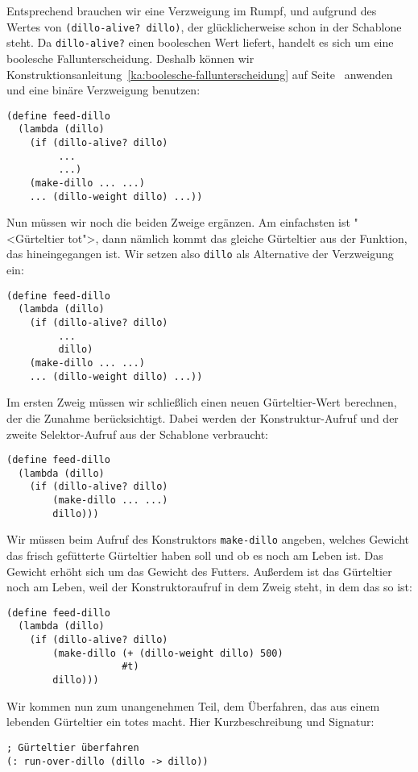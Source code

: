 Entsprechend brauchen wir eine Verzweigung im Rumpf, und aufgrund
des Wertes von \lstinline{(dillo-alive? dillo)}, der glücklicherweise schon in der
Schablone steht.  Da \lstinline{dillo-alive?} einen booleschen Wert
liefert, handelt es sich um eine boolesche Fallunterscheidung.
Deshalb 
können wir Konstruktionsanleitung~\ref{ka:boolesche-fallunterscheidung}
auf Seite~\pageref{ka:boolesche-fallunterscheidung} anwenden und eine
binäre Verzweigung benutzen:
%
\begin{lstlisting}
(define feed-dillo
  (lambda (dillo)
    (if (dillo-alive? dillo)
         ...
         ...)
    (make-dillo ... ...)
    ... (dillo-weight dillo) ...))
\end{lstlisting}
%
Nun müssen wir noch die beiden Zweige ergänzen.  Am
einfachsten ist "<Gürteltier tot">, dann nämlich kommt
das gleiche Gürteltier aus der Funktion, das hineingegangen ist.  Wir
setzen also \lstinline{dillo} als Alternative der Verzweigung ein:
%
\begin{lstlisting}
(define feed-dillo
  (lambda (dillo)
    (if (dillo-alive? dillo)
         ...
         dillo)
    (make-dillo ... ...)
    ... (dillo-weight dillo) ...))
\end{lstlisting}
%
Im ersten Zweig müssen wir schließlich einen neuen Gürteltier-Wert
berechnen, der die Zunahme berücksichtigt.  Dabei werden der
Konstruktur-Aufruf und der zweite Selektor-Aufruf aus der Schablone
verbraucht:
\begin{lstlisting}
(define feed-dillo
  (lambda (dillo)
    (if (dillo-alive? dillo)
        (make-dillo ... ...)
        dillo)))
\end{lstlisting}
%
Wir müssen beim Aufruf des Konstruktors \lstinline{make-dillo} angeben,
welches Gewicht das frisch gefütterte Gürteltier haben soll und ob es
noch am Leben ist.  Das Gewicht erhöht sich um das Gewicht des
Futters.  Außerdem ist das Gürteltier noch am Leben, weil der
Konstruktoraufruf in dem Zweig steht, in dem das so ist:
%
\begin{lstlisting}
(define feed-dillo
  (lambda (dillo)
    (if (dillo-alive? dillo)
        (make-dillo (+ (dillo-weight dillo) 500)
                    #t)
        dillo)))
\end{lstlisting}
%
Wir kommen nun zum unangenehmen Teil, dem Überfahren, das aus einem
lebenden Gürteltier ein totes macht.  Hier Kurzbeschreibung und
Signatur:\label{page:run-over-dillo}
%
\begin{lstlisting}
; Gürteltier überfahren
(: run-over-dillo (dillo -> dillo))
\end{lstlisting}

